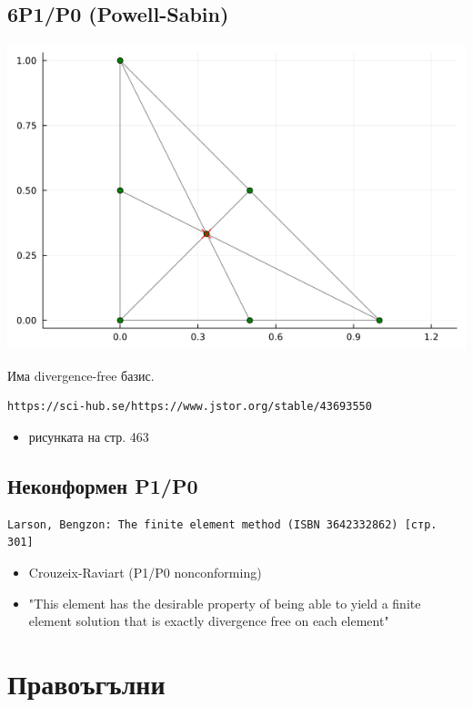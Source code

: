 \documentclass[fleqn,12pt]{article}
\begin{document}
\subsection{6P1/P0 (Powell-Sabin)}
\includegraphics[width=140mm]{img/6p1p0.png}

Има divergence-free базис.

\begin{verbatim}
https://sci-hub.se/https://www.jstor.org/stable/43693550
\end{verbatim}
\begin{itemize}
    \item рисунката на стр. 463
\end{itemize}

\subsection{Неконформен P1/P0}
\begin{verbatim}
Larson, Bengzon: The finite element method (ISBN 3642332862) [стр. 301] 
\end{verbatim}
\begin{itemize}
    \item Crouzeix-Raviart (P1/P0 nonconforming)
    \item "This element has the desirable property of being able to yield a finite
       element solution that is exactly divergence free on each element"

\end{itemize}

\section{Правоъгълни}
\end{document}
